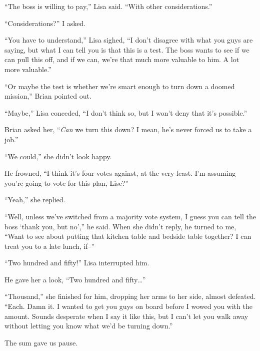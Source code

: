 ``The boss is willing to pay,'' Lisa said.  ``With other considerations.''



``Considerations?'' I asked.



``You have to understand,'' Lisa sighed, ``I don't disagree with what you guys are saying, but what I can tell you is that this is a test.  The boss wants to see if we can pull this off, and if we can, we're that much more valuable to him.  A lot more valuable.''



``Or maybe the test is whether we're smart enough to turn down a doomed mission,'' Brian pointed out.



``Maybe,'' Lisa conceded, ``I don't think so, but I won't deny that it's possible.''



Brian asked her, ``\emph{Can} we turn this down?  I mean, he's never forced us to take a job.''



``We could,'' she didn't look happy.



He frowned, ``I think it's four votes against, at the very least.  I'm assuming you're going to vote for this plan, Lise?''



``Yeah,'' she replied.



``Well, unless we've switched from a majority vote system, I guess you can tell the boss `thank you, but no','' he said.  When she didn't reply, he turned to me, ``Want to see about putting that kitchen table and bedside table together?  I can treat you to a late lunch, if--''



``Two hundred and fifty!'' Lisa interrupted him.



He gave her a look, ``Two hundred and fifty\ldots''



``Thousand,'' she finished for him, dropping her arms to her side, almost defeated.  ``Each.  Damn it.  I wanted to get you guys on board before I wowed you with the amount.  Sounds desperate when I say it like this, but I can't let you walk away without letting you know what we'd be turning down.''



The sum gave us pause.



